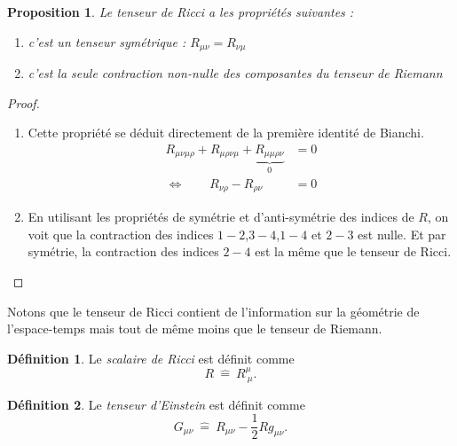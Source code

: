 \documentclass[a4paper,11pt]{report}
\theoremstyle{definition}
\theoremstyle{plain}
\newtheorem{prop}[thm]{Proposition}
\theoremstyle{definition}
\newtheorem{defn}{Définition}[chapter]
\theoremstyle{remark}
\begin{document}
        \begin{prop}
            Le tenseur de Ricci a les propriétés suivantes :
            \begin{enumerate}[label = \textit{\roman*)}]
                \item c'est un tenseur symétrique : $R_{\mu\nu} = R_{\nu\mu}$
                \item c'est la seule contraction non-nulle des composantes du tenseur de Riemann
            \end{enumerate}
        \end{prop}
        
        \begin{proof}${}$
            \begin{enumerate}[label = \textit{\roman*)}]
                \item Cette propriété se déduit directement de la première identité de Bianchi.
                \begin{align}
                    R_{\mu\nu\mu\rho}+R_{\mu\rho\nu\mu}+\underbrace{R_{\mu\mu\rho\nu}}_{0} &= 0\\
                    \Leftrightarrow\qquad R_{\nu\rho} - R_{\rho\nu} &= 0
                \end{align}
                \item En utilisant les propriétés de symétrie et d'anti-symétrie des indices de $R$, on voit que la contraction des indices $1-2$,$3-4$,$1-4$ et $2-3$ est nulle. Et par symétrie, la contraction des indices $2-4$ est la même que le tenseur de Ricci.
            \end{enumerate}
        \end{proof}
        
        Notons que le tenseur de Ricci contient de l'information sur la géométrie de l'espace-temps mais tout de même moins que le tenseur de Riemann.
        
         \begin{defn}
            Le \textit{scalaire de Ricci} est définit comme
            \begin{equation}
                R ~\hat{=}~ R^\mu_{~\mu}.
            \end{equation}
        \end{defn}
        
        \begin{defn}
            Le \textit{tenseur d'Einstein} est définit comme
            \begin{equation}
                G_{\mu\nu} ~\hat{=}~ R_{\mu\nu}-\frac{1}{2}Rg_{\mu\nu}.
            \end{equation}
        \end{defn}
        
\end{document}
